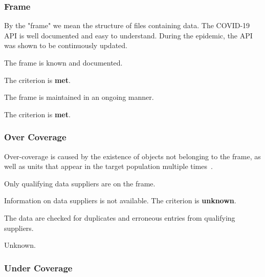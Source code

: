 \subsubsection{Frame}

By the "frame" we mean the structure of files containing data.
The COVID-19 API is well documented and easy to understand.
During the epidemic, the API was shown to be continuously updated.

\begin{QandA}
    \item The frame is known and documented.
    \begin{answered}
        The criterion is \textbf{met}.
    \end{answered}

    \item The frame is maintained in an ongoing manner.
    \begin{answered}
        The criterion is \textbf{met}.
    \end{answered}

\end{QandA}

\subsubsection{Over Coverage}

Over-coverage is caused by the existence of objects not belonging to the frame, as well as units that appear in the target population multiple times~\cite{over-coverage}.

\begin{QandA}
    \item Only qualifying data suppliers are on the frame.
    \begin{answered}
        Information on data suppliers is not available.
        The criterion is \textbf{unknown}.
    \end{answered}

    \item The data are checked for duplicates and erroneous entries from qualifying suppliers.
    \begin{answered}
        Unknown.
    \end{answered}

\end{QandA}

\subsubsection{Under Coverage}

